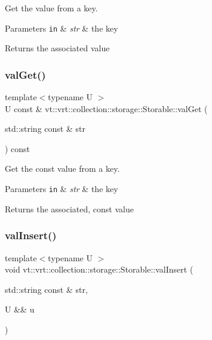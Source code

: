 Get the value from a key. 


\begin{DoxyParams}[1]{Parameters}
\mbox{\tt in}  & {\em str} & the key\\
\hline
\end{DoxyParams}
\begin{DoxyReturn}{Returns}
the associated value 
\end{DoxyReturn}
\mbox{\label{structvt_1_1vrt_1_1collection_1_1storage_1_1_storable_a5014622ff587047270462efeca4ca2dd}} 
\subsubsection{\texorpdfstring{val\+Get()}{valGet()}\hspace{0.1cm}{\footnotesize\ttfamily [2/2]}}
{\footnotesize\ttfamily template$<$typename U $>$ \\
U const  \& vt\+::vrt\+::collection\+::storage\+::\+Storable\+::val\+Get (\begin{DoxyParamCaption}\item[{std\+::string const \&}]{str }\end{DoxyParamCaption}) const}



Get the const value from a key. 


\begin{DoxyParams}[1]{Parameters}
\mbox{\tt in}  & {\em str} & the key\\
\hline
\end{DoxyParams}
\begin{DoxyReturn}{Returns}
the associated, const value 
\end{DoxyReturn}
\mbox{\label{structvt_1_1vrt_1_1collection_1_1storage_1_1_storable_a8c0cbce1b3e261dd375d431a56a7c350}} 
\subsubsection{\texorpdfstring{val\+Insert()}{valInsert()}\hspace{0.1cm}{\footnotesize\ttfamily [1/2]}}
{\footnotesize\ttfamily template$<$typename U $>$ \\
void vt\+::vrt\+::collection\+::storage\+::\+Storable\+::val\+Insert (\begin{DoxyParamCaption}\item[{std\+::string const \&}]{str,  }\item[{U \&\&}]{u }\end{DoxyParamCaption})}



